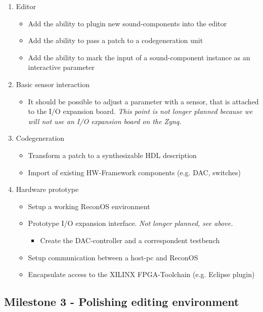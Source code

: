	\begin{enumerate}
		\item Editor
			\begin{itemize}
				\item Add the ability to plugin new sound-components into the editor
				\item Add the ability to pass a patch to a codegeneration unit
				\item Add the ability to mark the input of a sound-component instance as an interactive parameter
			\end{itemize}
		\item Basic sensor interaction
			\begin{itemize}
				\item It should be possible to adjust a parameter with a sensor, that is attached to the I/O expansion board. \textit{This point is not longer planned because we will not use an I/O expansion board on the Zynq.}
			\end{itemize}
		\item Codegeneration	
			\begin{itemize}
				\item Transform a patch to a synthesizable HDL description
				\item Import of existing HW-Framework components (e.g. \ac{DAC}, switches)
			\end{itemize}
		\item Hardware prototype %
			\begin{itemize}
				\item Setup a working ReconOS environment
				\item Prototype I/O expansion interface. \textit{Not longer planned, see above.}
				\begin{itemize}
					\item Create the DAC-controller and a correspondent testbench
				\end{itemize}
				\item Setup communication between a host-pc and ReconOS
				\item Encapsulate access to the XILINX \ac{FPGA}-Toolchain (e.g. Eclipse plugin)
			\end{itemize}
	\end{enumerate}

\subsection{Milestone 3 - Polishing editing environment}


